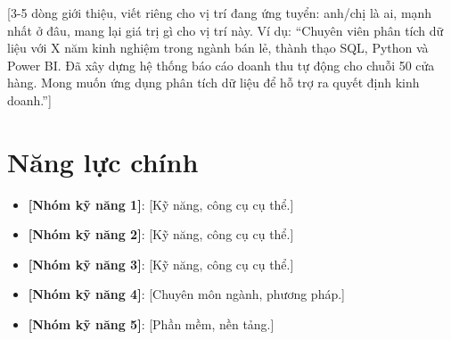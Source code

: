 \documentclass[11pt,a4paper,sans]{moderncv}
\begin{document}
\makecvtitle


\vspace{6pt}
\small{[3-5 dòng giới thiệu, viết riêng cho vị trí đang ứng tuyển: anh/chị là ai, mạnh nhất ở đâu, mang lại giá trị gì cho vị trí này. Ví dụ: ``Chuyên viên phân tích dữ liệu với X năm kinh nghiệm trong ngành bán lẻ, thành thạo SQL, Python và Power BI. Đã xây dựng hệ thống báo cáo doanh thu tự động cho chuỗi 50 cửa hàng. Mong muốn ứng dụng phân tích dữ liệu để hỗ trợ ra quyết định kinh doanh.'']}


\section{Năng lực chính}
\vspace{1pt}
\begin{itemize}

\item \textbf{[Nhóm kỹ năng 1]}: [Kỹ năng, công cụ cụ thể.]

\item \textbf{[Nhóm kỹ năng 2]}: [Kỹ năng, công cụ cụ thể.]

\item \textbf{[Nhóm kỹ năng 3]}: [Kỹ năng, công cụ cụ thể.]

\item \textbf{[Nhóm kỹ năng 4]}: [Chuyên môn ngành, phương pháp.]

\item \textbf{[Nhóm kỹ năng 5]}: [Phần mềm, nền tảng.]

\end{itemize}

\end{document}

